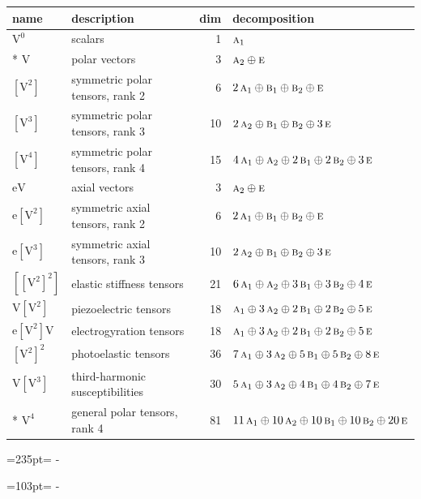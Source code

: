 \documentclass[10pt,a4paper]{article}
\newcommand{\needspace}[1]{\par\penalty-100\begingroup\dimen0=#1\relax\dimen2=\pagegoal
  \advance\dimen2-\pagetotal\ifdim\dimen0>\dimen2\relax\ifdim\dimen2>0pt\vfil\break\fi\fi
  \endgroup}
\numberwithin{equation}{section}
\newcommand{\irr}[1]{\text{\normalfont\scshape #1}}
\newcommand{\jahn}[1]{\mathrm{#1}}
\newlength{\fillwidth}\newlength{\cellwidth}\newlength{\colwidth}
\begin{document}
{\begin{longtable}{@{}llr>{\RaggedRight\arraybackslash}p{\fillwidth}@{}}
name & description & dim & decomposition\\\midrule\endhead
\bottomrule\endfoot\endlastfoot
$\jahn{V^{0}}$ & scalars & 1 & $\irr{a}_{1}$\\*
$\jahn{V}$ & polar vectors & 3 & $\irr{a}_{2} \oplus\allowbreak \irr{e}$\\
$\jahn{[V^{2}]}$ & symmetric polar tensors, rank 2 & 6 & $2\,\irr{a}_{1} \oplus\allowbreak \irr{b}_{1} \oplus\allowbreak \irr{b}_{2} \oplus\allowbreak \irr{e}$\\
$\jahn{[V^{3}]}$ & symmetric polar tensors, rank 3 & 10 & $2\,\irr{a}_{2} \oplus\allowbreak \irr{b}_{1} \oplus\allowbreak \irr{b}_{2} \oplus\allowbreak 3\,\irr{e}$\\
$\jahn{[V^{4}]}$ & symmetric polar tensors, rank 4 & 15 & $4\,\irr{a}_{1} \oplus\allowbreak \irr{a}_{2} \oplus\allowbreak 2\,\irr{b}_{1} \oplus\allowbreak 2\,\irr{b}_{2} \oplus\allowbreak 3\,\irr{e}$\\
$\jahn{eV}$ & axial vectors & 3 & $\irr{a}_{2} \oplus\allowbreak \irr{e}$\\
$\jahn{e[V^{2}]}$ & symmetric axial tensors, rank 2 & 6 & $2\,\irr{a}_{1} \oplus\allowbreak \irr{b}_{1} \oplus\allowbreak \irr{b}_{2} \oplus\allowbreak \irr{e}$\\
$\jahn{e[V^{3}]}$ & symmetric axial tensors, rank 3 & 10 & $2\,\irr{a}_{2} \oplus\allowbreak \irr{b}_{1} \oplus\allowbreak \irr{b}_{2} \oplus\allowbreak 3\,\irr{e}$\\
$\jahn{[[V^{2}]^{2}]}$ & elastic stiffness tensors & 21 & $6\,\irr{a}_{1} \oplus\allowbreak \irr{a}_{2} \oplus\allowbreak 3\,\irr{b}_{1} \oplus\allowbreak 3\,\irr{b}_{2} \oplus\allowbreak 4\,\irr{e}$\\
$\jahn{V[V^{2}]}$ & piezoelectric tensors & 18 & $\irr{a}_{1} \oplus\allowbreak 3\,\irr{a}_{2} \oplus\allowbreak 2\,\irr{b}_{1} \oplus\allowbreak 2\,\irr{b}_{2} \oplus\allowbreak 5\,\irr{e}$\\
$\jahn{e[V^{2}]V}$ & electrogyration tensors & 18 & $\irr{a}_{1} \oplus\allowbreak 3\,\irr{a}_{2} \oplus\allowbreak 2\,\irr{b}_{1} \oplus\allowbreak 2\,\irr{b}_{2} \oplus\allowbreak 5\,\irr{e}$\\
$\jahn{[V^{2}]^{2}}$ & photoelastic tensors & 36 & $7\,\irr{a}_{1} \oplus\allowbreak 3\,\irr{a}_{2} \oplus\allowbreak 5\,\irr{b}_{1} \oplus\allowbreak 5\,\irr{b}_{2} \oplus\allowbreak 8\,\irr{e}$\\
$\jahn{V[V^{3}]}$ & third-harmonic susceptibilities & 30 & $5\,\irr{a}_{1} \oplus\allowbreak 3\,\irr{a}_{2} \oplus\allowbreak 4\,\irr{b}_{1} \oplus\allowbreak 4\,\irr{b}_{2} \oplus\allowbreak 7\,\irr{e}$\\*
$\jahn{V^{4}}$ & general polar tensors, rank 4 & 81 & $11\,\irr{a}_{1} \oplus\allowbreak 10\,\irr{a}_{2} \oplus\allowbreak 10\,\irr{b}_{1} \oplus\allowbreak 10\,\irr{b}_{2} \oplus\allowbreak 20\,\irr{e}$\\
\bottomrule\end{longtable}}
\needspace{235pt}
\needspace{103pt}
\end{document}

